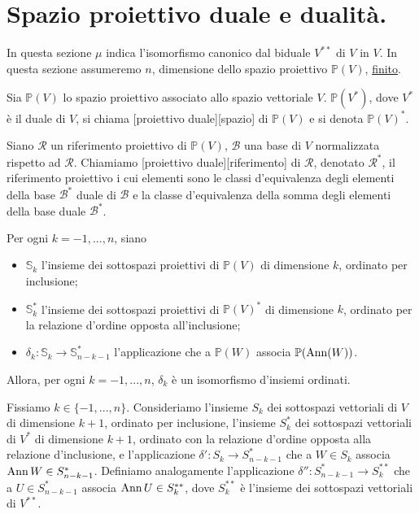 \section{Spazio proiettivo duale e dualit\`a.}

\par In questa sezione $\mu$ indica l'isomorfismo canonico dal biduale $V^{**}$ di $V$ in $V$. In questa sezione assumeremo $n$, dimensione dello spazio proiettivo $\mathbb{P}(V)$, \underline{finito}.
\begin{Definition}\label{def24}
	Sia $\mathbb{P}(V)$ lo spazio proiettivo associato allo spazio vettoriale $V$. $\mathbb{P}(V^*)$, dove $V^*$ \`e il duale di $V$, si chiama [proiettivo duale][spazio] di $\mathbb{P}(V)$ e si denota $\mathbb{P}(V)^*$.
\end{Definition}
\begin{Definition}\label{def25}
	Siano $\mathcal{R}$ un riferimento proiettivo di $\mathbb{P}(V)$, $\mathcal{B}$ una base di $V$ normalizzata rispetto ad $\mathcal{R}$. Chiamiamo [proiettivo duale][riferimento] di $\mathcal{R}$, denotato $\mathcal{R}^*$, il riferimento proiettivo i cui elementi sono le classi d'equivalenza degli elementi della base $\mathcal{B}^*$ duale di $\mathcal{B}$ e la classe d'equivalenza della somma degli elementi della base duale $\mathcal{B}^*$.
\end{Definition}
\begin{Theorem}\label{th25}
	Per ogni $k = -1, ..., n$, siano
	\begin{itemize}
		\item $\mathbb{S}_k$ l'insieme dei sottospazi proiettivi di $\mathbb{P}(V)$ di dimensione $k$, ordinato per inclusione;
		\item $\mathbb{S}_k^*$ l'insieme dei sottospazi proiettivi di $\mathbb{P}(V)^*$ di dimensione $k$, ordinato per la relazione d'ordine opposta all'inclusione;
		\item $\delta_k: \mathbb{S}_k \rightarrow \mathbb{S}_{n - k - 1}^*$ l'applicazione che a $\mathbb{P}(W)$ associa $\mathbb{P}(\operatorname{Ann}(W))$.
	\end{itemize}
	Allora, per ogni $k = -1, ..., n$, $\delta_k$ \`e un isomorfismo d'insiemi ordinati.
\end{Theorem}
\Proof Fissiamo $k \in \lbrace -1, ..., n \rbrace$. Consideriamo l'insieme $S_k$ dei sottospazi vettoriali di $V$ di dimensione $k + 1$, ordinato per inclusione, l'insieme $S_k^*$ dei sottospazi vettoriali di $V^*$ di dimensione $k + 1$, ordinato con la relazione d'ordine opposta alla relazione d'inclusione, e l'applicazione $\delta': S_k \rightarrow S_{n - k - 1}^*$ che a $W \in S_k$ associa $\operatorname{Ann} W \in S_{n - k - 1}^*$. Definiamo analogamente l'applicazione $\delta'': S_{n - k - 1}^* \rightarrow S_k^{**}$ che a $U \in S_{n - k - 1}^*$ associa $\operatorname{Ann} U \in S_k^{**}$, dove $S_k^{**}$ \`e l'insieme dei sottospazi vettoriali di $V^{**}$.
